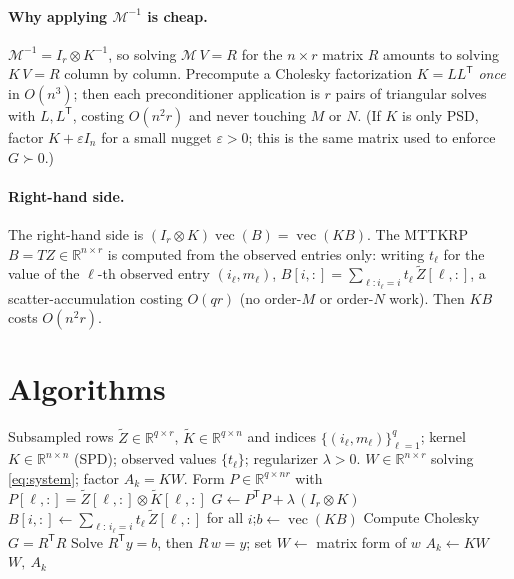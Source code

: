 \documentclass[12pt]{article}
\DeclareMathOperator{\vecop}{vec}
\newcommand{\bR}{\mathbb{R}}
\begin{document}
\paragraph{Why applying $\mathcal M^{-1}$ is cheap.}
$\mathcal M^{-1}=I_r\otimes K^{-1}$, so solving $\mathcal M\,V=R$ for the
$n\times r$ matrix $R$ amounts to solving $K\,V=R$ column by column. Precompute a
Cholesky factorization $K=LL^{\mathsf T}$ \emph{once} in $O(n^3)$; then each
preconditioner application is $r$ pairs of triangular solves with $L,L^{\mathsf T}$,
costing $O(n^2 r)$ and never touching $M$ or $N$. (If $K$ is only PSD, factor
$K+\varepsilon I_n$ for a small nugget $\varepsilon>0$; this is the same matrix
used to enforce $G\succ0$.)

\paragraph{Right-hand side.}
The right-hand side is $(I_r\otimes K)\vecop(B)=\vecop(KB)$. The MTTKRP
$B=TZ\in\bR^{n\times r}$ is computed from the observed entries only: writing
$t_\ell$ for the value of the $\ell$-th observed entry $(i_\ell,m_\ell)$,
$B[i,:]=\sum_{\ell:i_\ell=i}t_\ell\,\tilde Z[\ell,:]$, a scatter-accumulation
costing $O(qr)$ (no order-$M$ or order-$N$ work). Then $KB$ costs $O(n^2r)$.

\section{Algorithms}

\begin{algorithm}[h]
\caption{Direct symmetric solve of the mode-$k$ subproblem \eqref{eq:system}}
\label{alg:direct}
\begin{algorithmic}[1]
\Require Subsampled rows $\tilde Z\in\bR^{q\times r}$, $\tilde K\in\bR^{q\times n}$
  and indices $\{(i_\ell,m_\ell)\}_{\ell=1}^q$; kernel $K\in\bR^{n\times n}$ (SPD);
  observed values $\{t_\ell\}$; regularizer $\lambda>0$.
\Ensure $W\in\bR^{n\times r}$ solving \eqref{eq:system}; factor $A_k=KW$.
\State Form $P\in\bR^{q\times nr}$ with $P[\ell,:]=\tilde Z[\ell,:]\otimes\tilde K[\ell,:]$
\State $G\gets P^{\mathsf T}P+\lambda\,(I_r\otimes K)$
\State $B[i,:]\gets\sum_{\ell:\,i_\ell=i} t_\ell\,\tilde Z[\ell,:]$ for all $i$;\quad $b\gets\vecop(KB)$
\State Compute Cholesky $G=R^{\mathsf T}R$ 
\State Solve $R^{\mathsf T}y=b$, then $R\,w=y$; set $W\gets$ matrix form of $w$
\State $A_k\gets KW$ 
\State \Return $W,\ A_k$
\end{algorithmic}
\end{algorithm}
\end{document}
